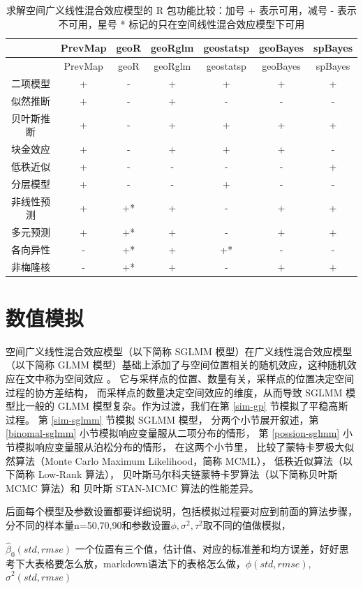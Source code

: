 \documentclass[12pt,a4paper,UTF8,twoside]{book}
\theoremstyle{definition}
\theoremstyle{definition}
\theoremstyle{definition}
\theoremstyle{remark}
\begin{document}
\begin{longtable}[]{@{}ccccccc@{}}
\caption{\label{tab:sglmm-packages} 求解空间广义线性混合效应模型的 R
包功能比较：加号 + 表示可用，减号 - 表示不可用，星号 *
标记的只在空间线性混合效应模型下可用}\tabularnewline
\toprule
& PrevMap & geoR & geoRglm & geostatsp & geoBayes &
spBayes\tabularnewline
\midrule
\endfirsthead
\toprule
& PrevMap & geoR & geoRglm & geostatsp & geoBayes &
spBayes\tabularnewline
\midrule
\endhead
二项模型 & + & - & + & + & + & +\tabularnewline
似然推断 & + & - & + & - & - & -\tabularnewline
贝叶斯推断 & + & - & + & + & + & +\tabularnewline
块金效应 & + & - & + & + & + & -\tabularnewline
低秩近似 & + & - & - & - & - & +\tabularnewline
分层模型 & + & - & - & + & - & -\tabularnewline
非线性预测 & + & +* & + & - & + & +\tabularnewline
多元预测 & + & +* & + & - & + & +\tabularnewline
各向异性 & - & +* & + & +* & - & -\tabularnewline
非梅隆核 & - & +* & + & - & + & +\tabularnewline
\bottomrule
\end{longtable}

\hypertarget{simulations}{%
\chapter{数值模拟}\label{simulations}}

空间广义线性混合效应模型（以下简称 SGLMM
模型）在广义线性混合效应模型（以下简称 GLMM
模型）基础上添加了与空间位置相关的随机效应，这种随机效应在文中称为空间效应
\citep{Diggle1998}。
它与采样点的位置、数量有关，采样点的位置决定空间过程的协方差结构，
而采样点的数量决定空间效应的维度，从而导致 SGLMM 模型比一般的 GLMM
模型复杂。作为过渡，我们在第 \ref{sim-gp} 节模拟了平稳高斯过程。 第
\ref{sim-sglmm} 节模拟 SGLMM 模型， 分两个小节展开叙述，第
\ref{binomal-sglmm} 小节模拟响应变量服从二项分布的情形， 第
\ref{possion-sglmm} 小节模拟响应变量服从泊松分布的情形，
在这两个小节里， 比较了蒙特卡罗极大似然算法（Monte Carlo Maximum
Likelihood，简称 MCML）， 低秩近似算法（以下简称 Low-Rank 算法），
贝叶斯马尔科夫链蒙特卡罗算法（以下简称贝叶斯 MCMC 算法）和 贝叶斯
STAN-MCMC 算法的性能差异。

后面每个模型及参数设置都要详细说明，包括模拟过程要对应到前面的算法步骤，分不同的样本量n=50,70,90和参数设置\(\phi,\sigma^2,\tau^2\)取不同的值做模拟，

\textbar{}\(\hat\beta_0(std,rmse)\)\textbar{}
一个位置有三个值，估计值、对应的标准差和均方误差，好好思考下大表格要怎么放，markdown语法下的表格怎么做，\textbar{}\(\hat\phi(std,rmse)\),\(\hat\sigma^2(std,rmse)\)\textbar{}
\end{document}
